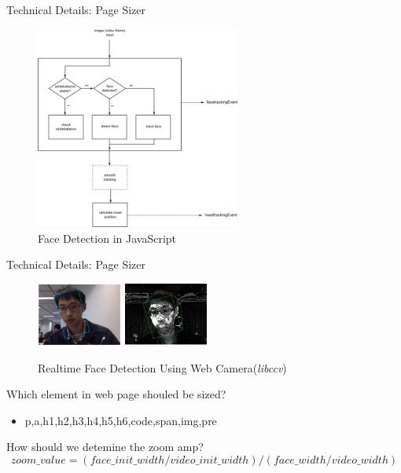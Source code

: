 \documentclass{beamer}
\begin{document}
\begin{frame}{Technical Details: Page Sizer}
\begin{center}
    \begin{figure}
        \includegraphics[width=0.6\textwidth]{./images/face_detectin.png}
        \caption{Face Detection in JavaScript}
    \end{figure}
\end{center}
\end{frame}

\begin{frame}{Technical Details: Page Sizer}
\begin{center}
    \begin{figure}
        \includegraphics[width=0.25\textwidth]{./images/face_detection_realtime.png}
        \includegraphics[width=0.25\textwidth]{./images/face_detection_possibility.png}
        \caption{Realtime Face Detection Using Web Camera(\emph{libccv})}
    \end{figure}
\end{center}
Which element in web page shouled be sized?
\begin{itemize}
    \item p,a,h1,h2,h3,h4,h5,h6,code,span,img,pre 
\end{itemize}
How should we detemine the zoom amp?
\begin{equation}
    zoom\_value = (face\_init\_width / video\_init\_width) / (face\_width / video\_width)
\end{equation}
\end{frame}
\end{document}

